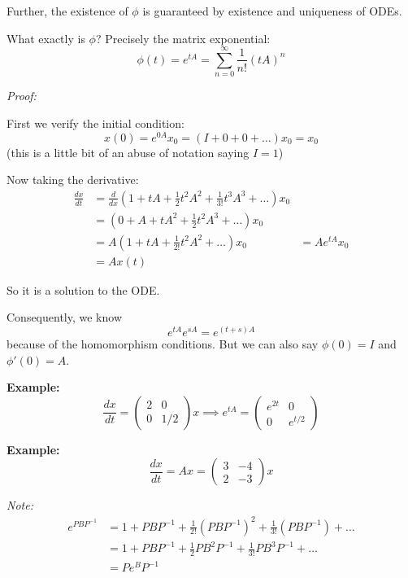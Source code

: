 \documentclass[12pt]{article}
\newenvironment*{tbox}[2][gray]{
    \begin{tcolorbox}[
        parbox=false,
        colback=#1!5!white,
        colframe=#1!75!black,
        breakable,
        title={#2}
    ]}
    {\end{tcolorbox}}
\begin{document}
    Further, the existence of $\phi$ is guaranteed by existence and uniqueness of ODEs. 

    What exactly is $\phi$? Precisely the matrix exponential:
    \[\phi(t) = e^{tA} = \sum_{n=0}^{\infty} \frac{1}{n!}(tA)^n\]

    \begin{tbox}{\textbf{Claim:} $x(t) = e^{tA}x_0$ solves $\frac{dx}{dt} = Ax$, $x(0) = x_0$}
        \emph{Proof:} 
        
        First we verify the initial condition: 
        \[x(0) = e^{0A}x_0 = (I + 0 + 0 + \dots) x_0 = x_0\]
        (this is a little bit of an abuse of notation saying $I = 1$)

        Now taking the derivative:
        \begin{align*}
            \frac{dx}{dt} &= \frac{d}{dx}(1 + tA + \frac{1}{2}t^2 A^2 + \frac{1}{3!}t^3 A^3 + \dots)x_0\\ 
            &= (0 + A + tA^2 + \frac{1}{2}t^2 A^3 + \dots)x_0\\
            &= A(1 + tA + \frac{1}{2!}t^2 A^2 + \dots)x_0
            &= Ae^{tA}x_0\\ 
            &= Ax(t)
        \end{align*}

        So it is a solution to the ODE.
    \end{tbox}

    Consequently, we know 
    \[e^{tA}e^{sA} = e^{(t+s)A}\] 
    because of the homomorphism conditions. But we can also say $\phi(0) = I$ and $\phi'(0) = A$. 

    \textbf{Example:} 
    \[\frac{dx}{dt} = \begin{pmatrix}
        2 & 0\\ 
        0 & 1/2
    \end{pmatrix}x \implies e^{tA} = \begin{pmatrix}
        e^{2t} & 0\\ 
        0 & e^{t/2}
    \end{pmatrix}\]

    \textbf{Example:} 
    \[\frac{dx}{dt} = Ax = \begin{pmatrix}
        3 & -4\\ 
        2 & -3
    \end{pmatrix} x\]

    \emph{Note:}
    \begin{align*}
        e^{PBP^{-1}} &= 1 + PBP^{-1} + \frac{1}{2!}(PBP^{-1})^2 + \frac{1}{3!}(PBP^{-1}) + \dots\\ 
        &= 1 + PBP^{-1} + \frac{1}{2}PB^2 P^{-1} + \frac{1}{3!} PB^3P^{-1} + \dots\\ 
        &= Pe^BP^{-1}
    \end{align*}
\end{document}
